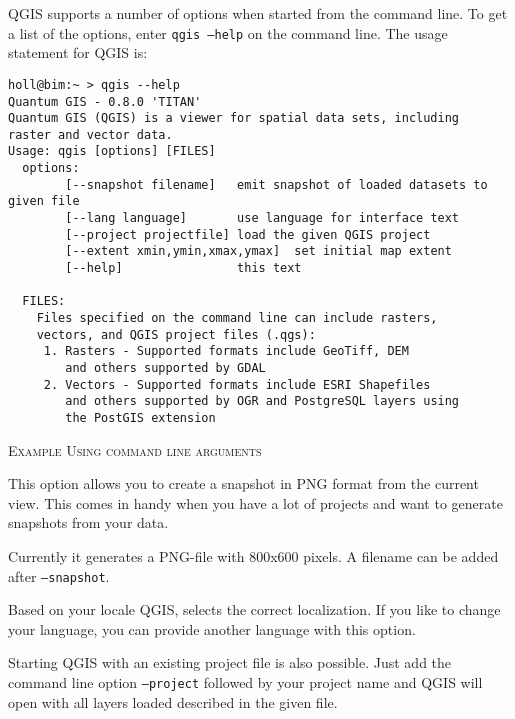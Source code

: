 QGIS supports a number of options when started from the command line. To
get a list of the options, enter \texttt{qgis --help} on the command line.
The usage statement for QGIS is:

\small
\begin{verbatim}
holl@bim:~ > qgis --help
Quantum GIS - 0.8.0 'TITAN'
Quantum GIS (QGIS) is a viewer for spatial data sets, including
raster and vector data.
Usage: qgis [options] [FILES]
  options:
        [--snapshot filename]   emit snapshot of loaded datasets to given file
        [--lang language]       use language for interface text
        [--project projectfile] load the given QGIS project
        [--extent xmin,ymin,xmax,ymax]  set initial map extent
        [--help]                this text

  FILES:
    Files specified on the command line can include rasters,
    vectors, and QGIS project files (.qgs):
     1. Rasters - Supported formats include GeoTiff, DEM
        and others supported by GDAL
     2. Vectors - Supported formats include ESRI Shapefiles
        and others supported by OGR and PostgreSQL layers using
        the PostGIS extension
\end{verbatim}
\normalsize

\begin{Tip} \caption{\textsc{Example Using command line arguments}}
\end{Tip}

This option allows you to create a snapshot in PNG format from the current view.
This comes in handy when you have a lot of projects and want to 
generate snapshots from your data.

Currently it generates a PNG-file with 800x600 pixels. A filename can be added after
\texttt{--snapshot}.

Based on your locale QGIS, selects the correct localization. If you like to 
change your language, you can provide another language with this option.

Starting QGIS with an existing project file is also possible. Just
add the command line option \texttt{--project} followed by your project name
and QGIS will open with all layers loaded described in the given file.

